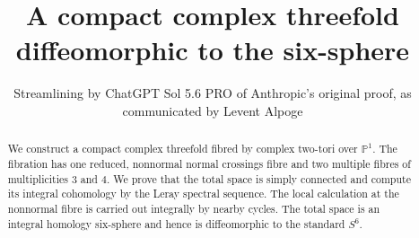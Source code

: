\documentclass[11pt]{amsart}
\title[A compact complex threefold diffeomorphic to $S^6$]
{A compact complex threefold diffeomorphic to the six-sphere}
\author[ChatGPT Sol 5.6 PRO]{Streamlining by ChatGPT Sol 5.6 PRO of Anthropic's original proof, as communicated by Levent Alpoge}
\date{}
\begin{document}
\begin{abstract}
We construct a compact complex threefold fibred by complex two-tori over
$\mathbb P^1$.  The fibration has one reduced, nonnormal normal crossings fibre and
two multiple fibres of multiplicities $3$ and $4$.  We prove that
the total space is simply connected and compute its integral cohomology by
the Leray spectral sequence.  The local calculation at the nonnormal fibre
is carried out integrally by nearby cycles.  The total space is an integral
homology six-sphere and hence is diffeomorphic to the standard $S^6$.
\end{abstract}

\maketitle










\appendix




\end{document}
